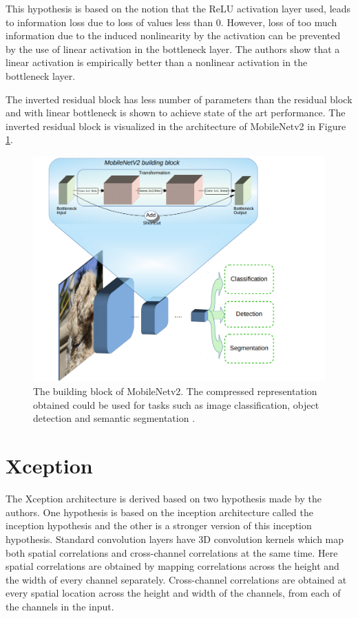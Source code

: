 This hypothesis is based on the notion that the ReLU activation layer used, leads to information loss due to loss of values less than 0. However, loss of too much information due to the induced nonlinearity by the activation can be prevented by the use of linear activation in the bottleneck layer. The authors show that a linear activation is empirically better than a nonlinear activation in the bottleneck layer.

The inverted residual block has less number of parameters than the residual block and with linear bottleneck is shown to achieve state of the art performance. The inverted residual block is visualized in the architecture of MobileNetv2 in Figure \ref{Fig:mobileNetv2bb}.

	\begin{figure}[h]
		\centering
		\includegraphics[width=1\linewidth]{images/mobileNetv2_bb}
		\caption{The building block of MobileNetv2. The compressed representation obtained could be used for tasks such as image classification, object detection and semantic segmentation \cite{mnbb}.}
		\label{Fig:mobileNetv2bb}
	\end{figure}

\section{Xception}
\label{section:xcep}

The Xception architecture is derived based on two hypothesis made by the authors. One hypothesis is based on the inception architecture called the inception hypothesis and the other is a stronger version of this inception hypothesis. Standard convolution layers have 3D convolution kernels which map both spatial correlations and cross-channel correlations at the same time. Here spatial correlations are obtained by mapping correlations across the height and the width of every channel separately. Cross-channel correlations are obtained at every spatial location across the height and width of the channels, from each of the channels in the input. 

